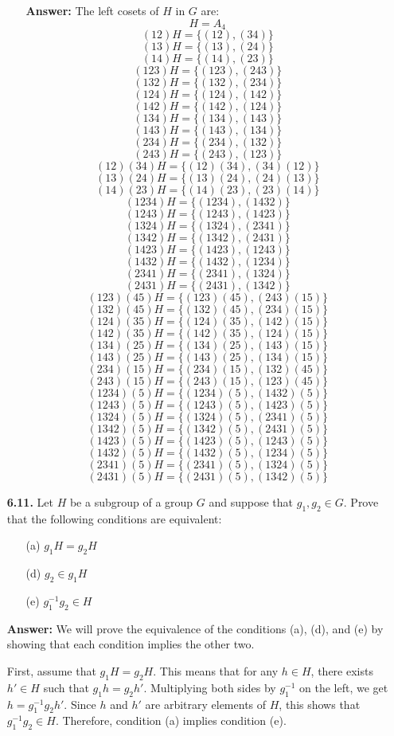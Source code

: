 \documentclass[12pt,reqno]{amsart}
\newcommand{\probskip}{\vskip1cm}
\begin{document}
\begin{enumerate}[{\bf 1.}]
\begin{enumerate}
\textbf{Answer:} The left cosets of $H$ in $G$ are:
\[
H = A_4
\]
\[
(12)H = \{(12), (34)\}
\]
\[
(13)H = \{(13), (24)\}
\]
\[
(14)H = \{(14), (23)\}
\]
\[
(123)H = \{(123), (243)\}
\]
\[
(132)H = \{(132), (234)\}
\]
\[
(124)H = \{(124), (142)\}
\]
\[
(142)H = \{(142), (124)\}
\]
\[
(134)H = \{(134), (143)\}
\]
\[
(143)H = \{(143), (134)\}
\]
\[
(234)H = \{(234), (132)\}
\]
\[
(243)H = \{(243), (123)\}
\]
\[
(12)(34)H = \{(12)(34), (34)(12)\}
\]
\[
(13)(24)H = \{(13)(24), (24)(13)\}
\]
\[
(14)(23)H = \{(14)(23), (23)(14)\}
\]
\[
(1234)H = \{(1234), (1432)\}
\]
\[
(1243)H = \{(1243), (1423)\}
\]
\[
(1324)H = \{(1324), (2341)\}
\]
\[
(1342)H = \{(1342), (2431)\}
\]
\[
(1423)H = \{(1423), (1243)\}
\]
\[
(1432)H = \{(1432), (1234)\}
\]
\[
(2341)H = \{(2341), (1324)\}
\]
\[
(2431)H = \{(2431), (1342)\}
\]
\[
(123)(45)H = \{(123)(45), (243)(15)\}
\]
\[
(132)(45)H = \{(132)(45), (234)(15)\}
\]
\[
(124)(35)H = \{(124)(35), (142)(15)\}
\]
\[
(142)(35)H = \{(142)(35), (124)(15)\}
\]
\[
(134)(25)H = \{(134)(25), (143)(15)\}
\]
\[
(143)(25)H = \{(143)(25), (134)(15)\}
\]
\[
(234)(15)H = \{(234)(15), (132)(45)\}
\]
\[
(243)(15)H = \{(243)(15), (123)(45)\}
\]
\[
(1234)(5)H = \{(1234)(5), (1432)(5)\}
\]
\[
(1243)(5)H = \{(1243)(5), (1423)(5)\}
\]
\[
(1324)(5)H = \{(1324)(5), (2341)(5)\}
\]
\[
(1342)(5)H = \{(1342)(5), (2431)(5)\}
\]
\[
(1423)(5)H = \{(1423)(5), (1243)(5)\}
\]
\[
(1432)(5)H = \{(1432)(5), (1234)(5)\}
\]
\[
(2341)(5)H = \{(2341)(5), (1324)(5)\}
\]
\[
(2431)(5)H = \{(2431)(5), (1342)(5)\}
\]
\end{enumerate}

\probskip

\item[{\bf 6.11.}] 
Let $H$ be a subgroup of a group $G$ and suppose that $g_1, g_2 \in G$.  Prove
that the following conditions are equivalent: 
\begin{enumerate}
 
\item[(a)]
$g_1 H = g_2 H$
 
\item[(d)]
$g_2 \in g_1 H$
 
\item[(e)]
$g_1^{-1} g_2 \in H$
\end{enumerate}

\textbf{Answer:} We will prove the equivalence of the conditions (a), (d), and (e) by showing that each condition implies the other two.

First, assume that $g_1 H = g_2 H$. This means that for any $h \in H$, there exists $h' \in H$ such that $g_1 h = g_2 h'$. Multiplying both sides by $g_1^{-1}$ on the left, we get $h = g_1^{-1} g_2 h'$. Since $h$ and $h'$ are arbitrary elements of $H$, this shows that $g_1^{-1} g_2 \in H$. Therefore, condition (a) implies condition (e).


\end{enumerate}
\end{document}
